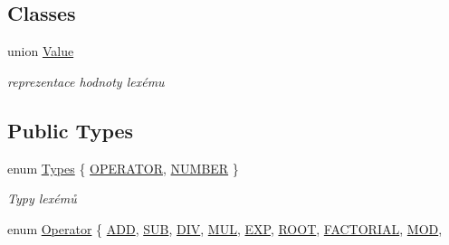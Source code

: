 \subsection*{Classes}
\begin{DoxyCompactItemize}
\item 
union \hyperlink{unionteam22_1_1_calc_1_1_lex_1_1_value}{Value}
\begin{DoxyCompactList}\small\item\em reprezentace hodnoty lexému \end{DoxyCompactList}\end{DoxyCompactItemize}
\subsection*{Public Types}
\begin{DoxyCompactItemize}
\item 
enum \hyperlink{classteam22_1_1_calc_1_1_lex_a295984577c98a23ddd20ee36d33145a2}{Types} \{ \hyperlink{classteam22_1_1_calc_1_1_lex_a295984577c98a23ddd20ee36d33145a2aa5609722e27933f9074b148e98c70a3b}{O\+P\+E\+R\+A\+T\+OR}, 
\hyperlink{classteam22_1_1_calc_1_1_lex_a295984577c98a23ddd20ee36d33145a2a016603184e8463620cf841dec9b33783}{N\+U\+M\+B\+ER}
 \}\begin{DoxyCompactList}\small\item\em Typy lexémů \end{DoxyCompactList}
\item 
enum \hyperlink{classteam22_1_1_calc_1_1_lex_a61d29fc4878a3b36d2de2f13c56ed932}{Operator} \{ \newline
\hyperlink{classteam22_1_1_calc_1_1_lex_a61d29fc4878a3b36d2de2f13c56ed932a8ea23c5d5cafb66151f94ce0fc7e3677}{A\+DD}, 
\hyperlink{classteam22_1_1_calc_1_1_lex_a61d29fc4878a3b36d2de2f13c56ed932a8fef3694ea5e14ff416907e90fb736c4}{S\+UB}, 
\hyperlink{classteam22_1_1_calc_1_1_lex_a61d29fc4878a3b36d2de2f13c56ed932adb91fbbc380e598b3d09bc424f799516}{D\+IV}, 
\hyperlink{classteam22_1_1_calc_1_1_lex_a61d29fc4878a3b36d2de2f13c56ed932a61a3bc185249f37b2a196b55f3b5a427}{M\+UL}, 
\newline
\hyperlink{classteam22_1_1_calc_1_1_lex_a61d29fc4878a3b36d2de2f13c56ed932ab68440fd94bc855e96432f0734dd6388}{E\+XP}, 
\hyperlink{classteam22_1_1_calc_1_1_lex_a61d29fc4878a3b36d2de2f13c56ed932ad9dc68a37981eff61741cbc660839f6f}{R\+O\+OT}, 
\hyperlink{classteam22_1_1_calc_1_1_lex_a61d29fc4878a3b36d2de2f13c56ed932a88420075287a73244fcaa4f2f851fc65}{F\+A\+C\+T\+O\+R\+I\+AL}, 
\hyperlink{classteam22_1_1_calc_1_1_lex_a61d29fc4878a3b36d2de2f13c56ed932a70d91e1bc184de6388bd44d6fd83e0da}{M\+OD}, 

\end{DoxyCompactItemize}
